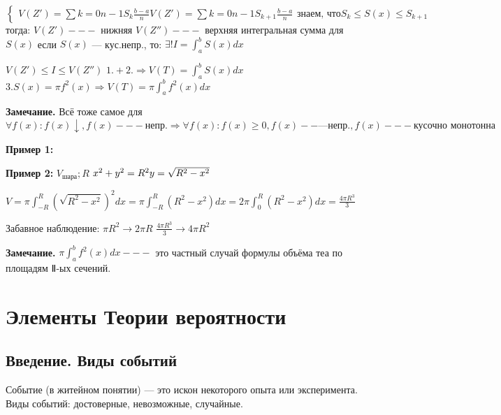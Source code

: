 \documentclass{article}
\begin{document}

    \(\begin{cases}
        V(Z') = \sum{k = 0}{n - 1}S_k\frac{b-a}{n}
        V(Z') = \sum{k = 0}{n - 1}S_{k+1}\frac{b-a}{n}
    \end{cases} \textrm{знаем, что} S_k \leq S(x) \leq S_{k+1}\)
    тогда:
    \(V(Z') ---\) нижняя
    \(V(Z'') ---\) верхняя интегральная сумма для \(S(x)\) если $S(x)$ — кус.непр., то:
    \(\exists! I = \int_{a}^{b} S(x)dx \)

    \( V(Z') \leq I \leq V(Z'') \)
    \(1. + 2. \Rightarrow V(T) = \int_{a}^{b}S(x)dx \)
    \(3. S(x) = \pi f^2(x) \Rightarrow V(T) = \pi \int_a^b f^2(x)dx \)

    \textbf{Замечание.}
    Всё тоже самое для \(\forall f(x): f(x) \downarrow, f(x) --- \textrm{непр.} \Rightarrow \forall f(x): f(x) \geq 0, f(x) --— \textrm{непр.}, f(x) --- \textrm{кусочно монотонна}\)

    \textbf{Пример 1:}




    \textbf{Пример 2:}
    \(V_{\textrm{шара}}; R\)
    \(x^2 + y^2 = R^2 \\ y = \sqrt{R^2 - x^2} \)

    \( V = \pi \int_{-R}^{R}(\sqrt{R^2 - x^2})^2 dx =  \pi \int_{-R}^{R} (R^2 - x^2) dx = 2\pi \int_{0}^{R} (R^2 - x^2) dx = \frac{4\pi R^3}{3}\)

    Забавное наблюдение:
    \(\pi R^2 \rightarrow 2 \pi R\)
    \(\frac{4\pi R^3}{3} \rightarrow 4\pi R^2\)

    \textbf{Замечание.} \(\pi \int_a^b f^2(x)dx ---\) это частный случай формулы объёма теа по площадям Ⅱ-ых сечений.

    




    \section*{Элементы Теории вероятности} 
    \subsection*{Введение. Виды событий} %
    Событие (в житейном понятии) — это искон некоторого опыта или эксперимента.
    Виды событий: достоверные, невозможные, случайные.
\end{document}
